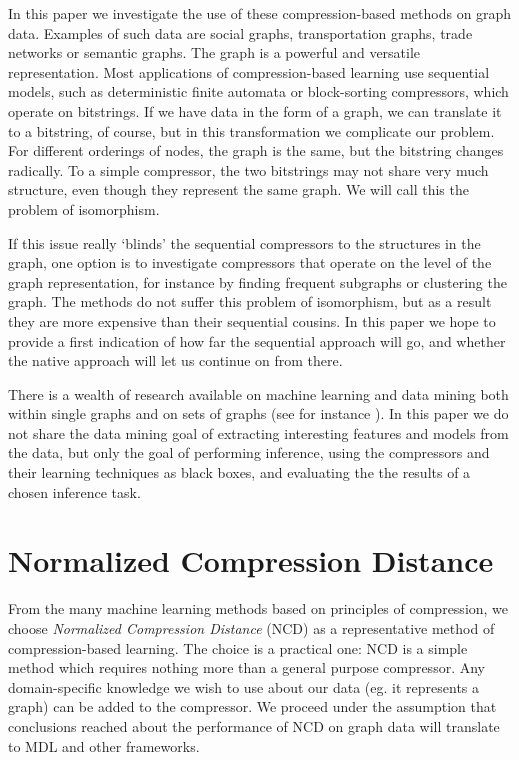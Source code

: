\documentclass{article}
\begin{document}
In this paper we investigate the use of these compression-based methods on graph data. Examples of such data are social graphs, transportation graphs, trade networks or semantic graphs. The graph is a powerful and versatile representation. Most applications of compression-based learning use sequential models, such as deterministic finite automata or block-sorting compressors, which operate on bitstrings. If we have data in the form of a graph, we can translate it to a bitstring, of course, but in this transformation we complicate our problem. For different orderings of nodes, the graph is the same, but the bitstring changes radically. To a simple compressor, the two bitstrings may not share very much structure, even though they represent the same graph. We will call this the problem of isomorphism.

If this issue really `blinds' the sequential compressors to the structures in the graph, one option is to investigate compressors that operate on the level of the graph representation, for instance by finding frequent subgraphs or clustering the graph. The methods do not suffer this problem of isomorphism, but as a result they are more expensive than their sequential cousins. In this paper we hope to provide a first indication of how far the sequential approach will go, and whether the native approach will let us continue on from there.

There is a wealth of research available on machine learning and data mining both within single graphs and on sets of graphs (see for instance ). In this paper we do not share the data mining goal of extracting interesting features and models from the data, but only the goal of performing inference, using the compressors and their learning techniques as black boxes, and evaluating the the results of a chosen inference task. 

\section*{Normalized Compression Distance}

From the many machine learning methods based on principles of compression, we choose \emph{Normalized Compression Distance} (NCD) as a representative method of compression-based learning. The choice is a practical one: NCD is a simple method which requires nothing more than a general purpose compressor. Any domain-specific knowledge we wish to use about our data (eg. it represents a graph) can be added to the compressor. We proceed under the assumption that conclusions reached about the performance of NCD on graph data will translate to MDL and other frameworks.
\end{document}
